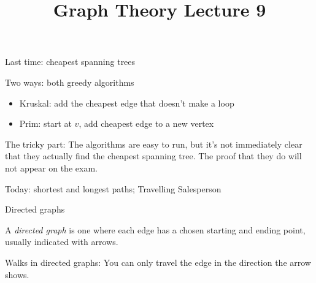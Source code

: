 \documentclass{beamer}
\title{Graph Theory Lecture 9}
\begin{document}
\begin{frame}{Last time: cheapest spanning trees}
  \begin{block}{Two ways: both greedy algorithms}

    \begin{itemize}
    \item Kruskal: add the cheapest edge that doesn't make a loop
    \item Prim: start at $v$, add cheapest edge to a new vertex
    \end{itemize}
  \end{block}

  \begin{block}{The tricky part:}
    The algorithms are easy to run, but it's not immediately clear that they actually find the cheapest spanning tree.  The proof that they do will not appear on the exam.
    \end{block}

  \begin{block}{Today: shortest and longest paths; Travelling Salesperson}
    \end{block}

\end{frame}

\begin{frame}{Directed graphs}
  \begin{definition} A \emph{directed graph} is one where each edge has a chosen starting and ending point, usually indicated with arrows.
 \end{definition}
\begin{center}
\end{center}


  
  \begin{block}{Walks in directed graphs:}
You can only travel the edge in the direction the arrow shows.
    \end{block}
\end{frame}
\end{document}
